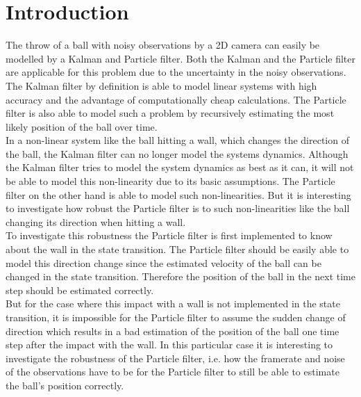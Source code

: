 \documentclass[conference]{IEEEtran}
\begin{document}
\section{Introduction}
The throw of a ball with noisy observations by a 2D camera can easily be modelled by a Kalman and Particle filter. 
Both the Kalman and the Particle filter are applicable for this problem due to the uncertainty in the noisy observations.
The Kalman filter by definition is able to model linear systems with high accuracy and the advantage of computationally cheap calculations. 
The Particle filter is also able to model such a problem by recursively estimating the most likely position of the ball over time. \\
In a non-linear system like the ball hitting a wall, which changes the direction of the ball, the Kalman filter can no longer model the systems dynamics.  
Although the Kalman filter tries to model the system dynamics as best as it can, it will not be able to model this non-linearity due to its basic assumptions. 
The Particle filter on the other hand is able to model such non-linearities. 
But it is interesting to investigate how robust the Particle filter is to such non-linearities like the ball changing its direction when hitting a wall. \\
To investigate this robustness the Particle filter is first implemented to know about the wall in the state transition. 
The Particle filter should be easily able to model this direction change since the estimated velocity of the ball can be changed in the state transition.
Therefore the position of the ball in the next time step should be estimated correctly. \\
But for the case where this impact with a wall is not implemented in the state transition, it is impossible for the Particle filter to assume the sudden change of direction which results in a bad estimation of the position of the ball one time step after the impact with the wall.
In this particular case it is interesting to investigate the robustness of the Particle filter, i.e. how the framerate and noise of the observations have to be for the Particle filter to still be able to estimate the ball's position correctly.
\end{document}
